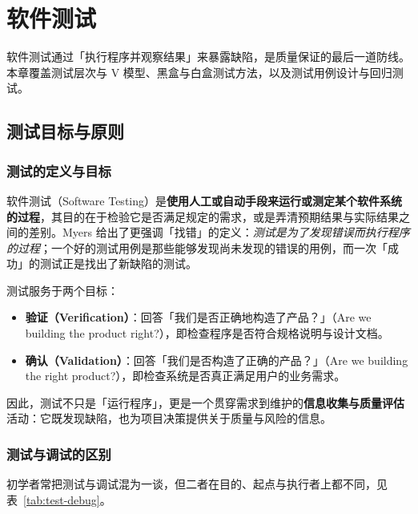 \clearpage
\begingroup
\let\clearpage\relax
\let\cleardoublepage\relax
\vspace*{\fill}
\chapter{软件测试}
\begin{center}
软件测试通过「执行程序并观察结果」来暴露缺陷，是质量保证的最后一道防线。本章覆盖测试层次与 V 模型、黑盒与白盒测试方法，以及测试用例设计与回归测试。
\end{center}
\vspace*{\fill}
\endgroup
\clearpage

\section{测试目标与原则}

\subsection{测试的定义与目标}

软件测试（Software Testing）是\textbf{使用人工或自动手段来运行或测定某个软件系统的过程}，其目的在于检验它是否满足规定的需求，或是弄清预期结果与实际结果之间的差别。Myers 给出了更强调「找错」的定义：\emph{测试是为了发现错误而执行程序的过程}；一个好的测试用例是那些能够发现尚未发现的错误的用例，而一次「成功」的测试正是找出了新缺陷的测试。

测试服务于两个目标：

\begin{itemize}
    \item \textbf{验证（Verification）}：回答「我们是否正确地构造了产品？」（Are we building the product right?），即检查程序是否符合规格说明与设计文档。
    \item \textbf{确认（Validation）}：回答「我们是否构造了正确的产品？」（Are we building the right product?），即检查系统是否真正满足用户的业务需求。
\end{itemize}

因此，测试不只是「运行程序」，更是一个贯穿需求到维护的\textbf{信息收集与质量评估}活动：它既发现缺陷，也为项目决策提供关于质量与风险的信息。

\subsection{测试与调试的区别}

初学者常把测试与调试混为一谈，但二者在目的、起点与执行者上都不同，见表~\ref{tab:test-debug}。

